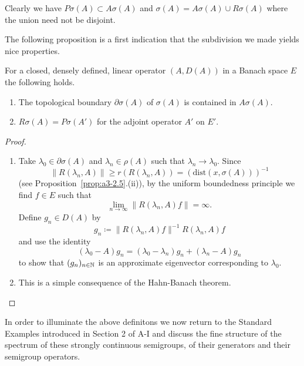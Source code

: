 Clearly we have $P\sigma(A) \subset A\sigma(A)$ and $\sigma(A) = A\sigma(A) \cup R\sigma(A)$ where the union need not be disjoint.

The following proposition is a first indication that the subdivision we made yields nice properties.
\begin{proposition}\label{prop:a3-2.2}
For a closed, densely defined, linear operator $(A,D(A))$ in a Banach space $E$ the following holds.
\begin{enumerate}[\upshape (i)]

\item
The topological boundary $\partial\sigma(A)$ of $\sigma(A)$ is contained in $A\sigma(A)$.

\item
$R\sigma(A) = P\sigma(A')$ for the adjoint operator $A'$ on $E'$.

\end{enumerate}
\end{proposition}
\begin{proof}
\begin{enumerate}[\upshape (i), wide, labelsep=.5em]

\item 
Take $\lambda_{0} \in \partial\sigma(A)$ and $\lambda_{n} \in \rho(A)$ such that $\lambda_{n} \to \lambda_{0}$.
Since 
%
\[
	 \|R(\lambda_{n},A)\| \geq r(R(\lambda_{n},A)) = (\text{dist}(x,\sigma(A)))^{-1} 
\]
%
(see Proposition~\ref{prop:a3-2.5}.(ii)), by the uniform boundedness principle we find $f \in E$ such that
\[
	\lim_{n \to \infty}\|R(\lambda_n ,A)f\| = \infty .
\]
Define $g_{n} \in D(A)$ by
\[
g_{n} \coloneqq \|R(\lambda_{n},A)f\|^{-1} R(\lambda_{n},A)f
\]
and use the identity
\[
	(\lambda_{0} - A)g_{n} = (\lambda_{0} - \lambda_{n})g_{n} + (\lambda_{n} - A)g_{n}
\]
to show that $(g_{n})_{n \in \mathbb{N}}$ is an approximate eigenvector corresponding to $\lambda_{0}$.

\item 
This is a simple consequence of the Hahn-Banach theorem.
\end{enumerate}
\end{proof}
In order to illuminate the above definitons we now return to the Standard Examples introduced in Section 2 of A-I and discuss the fine structure of the spectrum of these strongly continuous semigroups, \ie of their generators and their semigroup operators.
